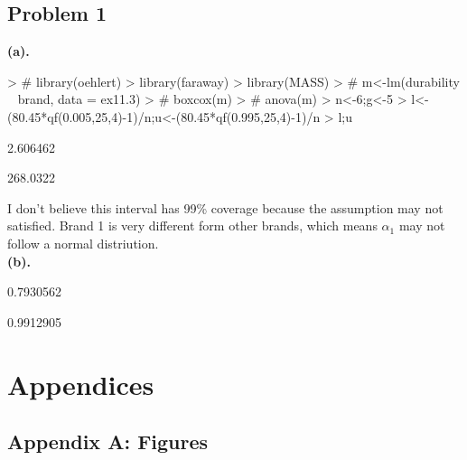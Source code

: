 \documentclass[11pt a4paper]{article}
\begin{document}
\subsection*{Problem 1}  %

\textbf{(a).}
\begin{Schunk}
\begin{Sinput}
> # library(oehlert)
>   library(faraway)
>   library(MASS)
> # m<-lm(durability ~ brand, data = ex11.3)
> # boxcox(m)
> # anova(m)
> n<-6;g<-5
> l<-(80.45*qf(0.005,25,4)-1)/n;u<-(80.45*qf(0.995,25,4)-1)/n
> l;u
\end{Sinput}
\begin{Soutput}
[1] 2.606462
\end{Soutput}
\begin{Soutput}
[1] 268.0322
\end{Soutput}
\end{Schunk}
I don't believe this interval has 99\% coverage because the assumption may not satisfied. Brand 1 is very different form other brands, which means $\alpha_1$ may not follow a normal distriution.\\

\textbf{(b).}
\begin{Schunk}
\begin{Soutput}
[1] 0.7930562
\end{Soutput}
\begin{Soutput}
[1] 0.9912905
\end{Soutput}
\end{Schunk}








\nocite*{}  




\newpage
\section*{Appendices}

\subsection*{Appendix A: Figures}
\end{document}
